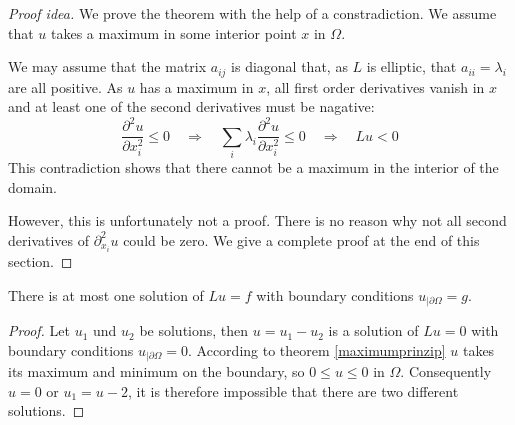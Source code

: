 \begin{proof}[Proof idea]
We prove the theorem with the help of a constradiction.
We assume that $u$ takes a maximum in some interior point $x$
in $\Omega$.

We may assume that the matrix $a_{ij}$ is diagonal that, as $L$
is elliptic, that $a_{ii}=\lambda_i$ are all positive.
As $u$ has a maximum in $x$, all first order derivatives vanish
in $x$ and at least one of the second derivatives
must be nagative:
\[
\frac{\partial^2u}{\partial x_i^2}
\le 0
\quad
\Rightarrow
\quad
\sum_{i}\lambda_i \frac{\partial^2u}{\partial x_i^2} \le 0
\quad
\Rightarrow
\quad
Lu<0
\]
This contradiction shows that there cannot be a maximum in the
interior of the domain.

However, this is unfortunately not a proof.
There is no reason why not all second derivatives of $\partial^2_{x_i} u$ 
could be zero.
We give a complete proof at the end of this section.
\end{proof}

\begin{satz}
There is at most one solution of
$Lu=f$ 
with boundary conditions
$u_{|\partial\Omega}=g$.
\end{satz}

\begin{proof}
Let $u_1$ und $u_2$ be solutions, then $u=u_1-u_2$ is a solution of
$Lu=0$ with boundary conditions $u_{|\partial\Omega}=0$.
According to theorem \ref{maximumprinzip} $u$ takes its maximum and
minimum on the boundary, so $0\le u\le 0$ in $\Omega$.
Consequently $u=0$ or $u_1=u-2$, it is therefore impossible that
there are two different solutions.
\end{proof}

